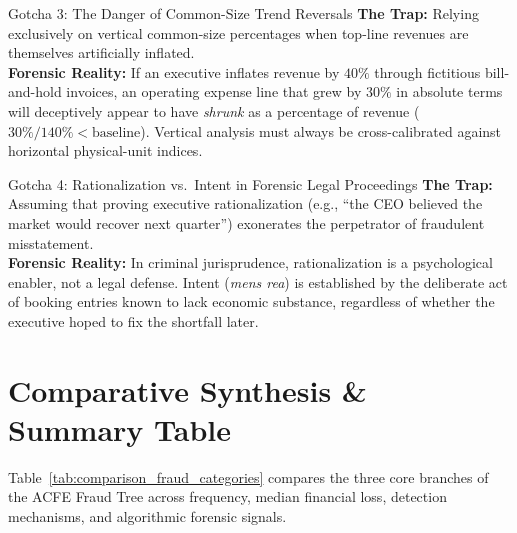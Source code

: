 \begin{trapbox}{Gotcha 3: The Danger of Common-Size Trend Reversals}
\textbf{The Trap:} Relying exclusively on vertical common-size percentages when top-line revenues are themselves artificially inflated.\\
\textbf{Forensic Reality:} If an executive inflates revenue by $40\%$ through fictitious bill-and-hold invoices, an operating expense line that grew by $30\%$ in absolute terms will deceptively appear to have \textit{shrunk} as a percentage of revenue ($30\% / 140\% < \text{baseline}$). Vertical analysis must always be cross-calibrated against horizontal physical-unit indices.
\end{trapbox}

\begin{trapbox}{Gotcha 4: Rationalization vs.~Intent in Forensic Legal Proceedings}
\textbf{The Trap:} Assuming that proving executive rationalization (e.g., ``the CEO believed the market would recover next quarter'') exonerates the perpetrator of fraudulent misstatement.\\
\textbf{Forensic Reality:} In criminal jurisprudence, rationalization is a psychological enabler, not a legal defense. Intent (\textit{mens rea}) is established by the deliberate act of booking entries known to lack economic substance, regardless of whether the executive hoped to fix the shortfall later.
\end{trapbox}

\section{Comparative Synthesis \& Summary Table}

Table~\ref{tab:comparison_fraud_categories} compares the three core branches of the ACFE Fraud Tree across frequency, median financial loss, detection mechanisms, and algorithmic forensic signals.


